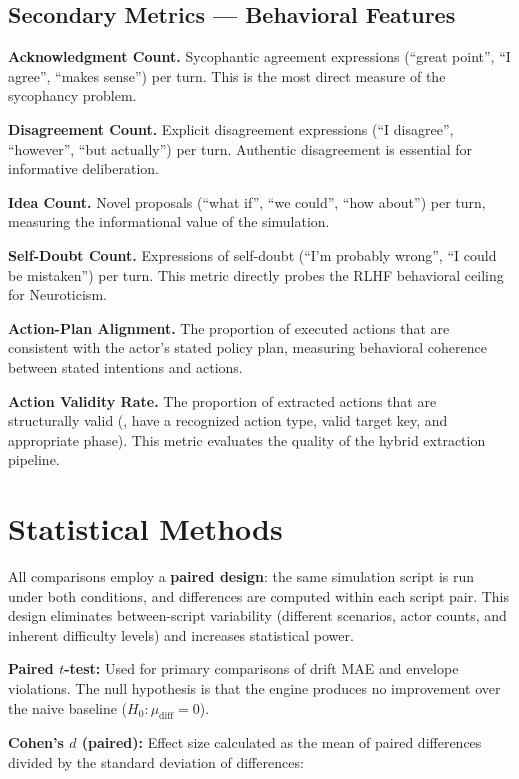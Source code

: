 \subsection{Secondary Metrics --- Behavioral Features}

\textbf{Acknowledgment Count.} Sycophantic agreement expressions (``great point'', ``I agree'', ``makes sense'') per turn. This is the most direct measure of the sycophancy problem.

\textbf{Disagreement Count.} Explicit disagreement expressions (``I disagree'', ``however'', ``but actually'') per turn. Authentic disagreement is essential for informative deliberation.

\textbf{Idea Count.} Novel proposals (``what if'', ``we could'', ``how about'') per turn, measuring the informational value of the simulation.

\textbf{Self-Doubt Count.} Expressions of self-doubt (``I'm probably wrong'', ``I could be mistaken'') per turn. This metric directly probes the RLHF behavioral ceiling for Neuroticism.

\textbf{Action-Plan Alignment.} The proportion of executed actions that are consistent with the actor's stated policy plan, measuring behavioral coherence between stated intentions and actions.

\textbf{Action Validity Rate.} The proportion of extracted actions that are structurally valid (\ie, have a recognized action type, valid target key, and appropriate phase). This metric evaluates the quality of the hybrid extraction pipeline.


\section{Statistical Methods}

All comparisons employ a \textbf{paired design}: the same simulation script is run under both conditions, and differences are computed within each script pair. This design eliminates between-script variability (different scenarios, actor counts, and inherent difficulty levels) and increases statistical power.

\textbf{Paired $t$-test:} Used for primary comparisons of drift MAE and envelope violations. The null hypothesis is that the engine produces no improvement over the naive baseline ($H_0\colon \mu_{\text{diff}} = 0$).

\textbf{Cohen's $d$ (paired):} Effect size calculated as the mean of paired differences divided by the standard deviation of differences:

